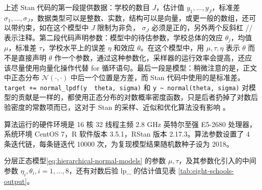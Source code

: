 \documentclass[12pt,a4paper,UTF8,twoside]{book}
\theoremstyle{definition}
\theoremstyle{definition}
\theoremstyle{definition}
\theoremstyle{remark}
\begin{document}
上述 Stan 代码的第一段提供数据：学校的数目 \(J\)，估计值
\(y_1,\ldots,y_{J}\)，标准差
\(\sigma_1,\ldots,\sigma_{J}\)，数据类型可以是整数、实数，结构可以是向量，或更一般的数组，还可以带约束，如在这个模型中
\(J\) 限制为非负， \(\sigma_{J}\) 必须是正的，另外两个反斜杠 //
表示注释。第二段代码声明参数：模型中的待估参数，学校总体的效应
\(\theta_j\)，均值 \(\mu\)，标准差 \(\tau\)，学校水平上的误差 \(\eta\)
和效应 \(\theta\)。在这个模型中，用 \(\mu,\tau,\eta\) 表示 \(\theta\)
而不是直接声明 \(\theta\)
作一个参数，通过这种参数化，采样器的运行效率会提高，还应该尽量使用向量化操作代替
for 循环语句。最后一段是模型：稍微注意的是，正文中正态分布
\(\mathcal{N}(\cdot,\cdot)\) 中后一个位置是方差，而 Stan
代码中使用的是标准差。\texttt{target\ +=\ normal\_lpdf(y\ \textbar{}\ theta,\ sigma)}
和 \texttt{y\ \textasciitilde{}\ normal(theta,\ sigma)}
对模型的贡献是一样的，都使用正态分布的对数概率密度函数，只是后者扔掉了对数后验密度的常数项而已，这对于
Stan 的采样、近似和优化算法没有影响 \citep{Stan2017JSS}。

算法运行的硬件环境是 16 核 32 线程主频 2.8 GHz 英特尔至强 E5-2680
处理器，系统环境 CentOS 7，R 软件版本 3.5.1，RStan 版本
2.17.3。算法参数设置了 4 条迭代链，每条链迭代 10000
次，为复现模型结果随机数种子设为 2018。

分层正态模型\eqref{eq:hierarchical-normal-models} 的参数
\(\mu,\tau\)，及其参数化引入的中间参数
\(\eta_i,\theta_i,i=1,\ldots,8\)，还有对数后验 \(\mathrm{lp}\_\_\)
的估计值见表 \ref{tab:eight-schools-output}。
\end{document}

